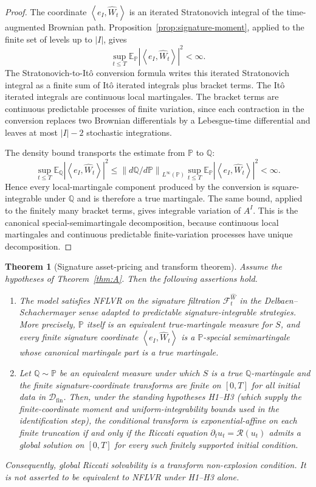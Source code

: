 \documentclass[11pt,oneside]{article}
\theoremstyle{plain}
\newtheorem{theorem}{Theorem}[section]
\theoremstyle{definition}
\theoremstyle{remark}
\newcommand{\E}{\mathbb{E}}
\newcommand{\Q}{\mathbb{Q}}
\newcommand{\Pp}{\mathbb{P}}
\newcommand{\cW}{\widehat W}
\newcommand{\FWh}{\mathcal F^{\widehat W}}
\newcommand{\Rs}{\mathcal R}
\newcommand{\norm}[1]{\left\lVert #1\right\rVert}
\newcommand{\abs}[1]{\left\lvert #1\right\rvert}
\newcommand{\inner}[2]{\left\langle #1,#2\right\rangle}
\begin{document}
\begin{proof}
The coordinate $\inner{e_I}{\cW_t}$ is an iterated Stratonovich integral of the time-augmented Brownian path. Proposition~\ref{prop:signature-moment}, applied to the finite set of levels up to $|I|$, gives
\[
\sup_{t\leq T}\E_\Pp\abs{\inner{e_I}{\cW_t}}^2<\infty.
\]
The Stratonovich-to-It\^o conversion formula writes this iterated Stratonovich integral as a finite sum of It\^o iterated integrals plus bracket terms. The It\^o iterated integrals are continuous local martingales. The bracket terms are continuous predictable processes of finite variation, since each contraction in the conversion replaces two Brownian differentials by a Lebesgue-time differential and leaves at most $|I|-2$ stochastic integrations.

The density bound transports the estimate from $\Pp$ to $\Q$:
\[
\sup_{t\leq T}\E_\Q\abs{\inner{e_I}{\cW_t}}^2
\leq \norm{d\Q/d\Pp}_{L^\infty(\Pp)}
\sup_{t\leq T}\E_\Pp\abs{\inner{e_I}{\cW_t}}^2<\infty.
\]
Hence every local-martingale component produced by the conversion is square-integrable under $\Q$ and is therefore a true martingale. The same bound, applied to the finitely many bracket terms, gives integrable variation of $A^I$. This is the canonical special-semimartingale decomposition, because continuous local martingales and continuous predictable finite-variation processes have unique decomposition.
\end{proof}

\begin{theorem}[Signature asset-pricing and transform theorem]\label{thm:B}
Assume the hypotheses of Theorem~\ref{thm:A}. Then the following assertions hold.
\begin{enumerate}[label=(\roman*)]
\item The model satisfies NFLVR on the signature filtration $\FWh_t$ in the Delbaen--Schachermayer sense adapted to predictable signature-integrable strategies. More precisely, $\Pp$ itself is an equivalent true-martingale measure for $S$, and every finite signature coordinate $\inner{e_I}{\cW_t}$ is a $\Pp$-special semimartingale whose canonical martingale part is a true martingale.
\item Let $\Q\sim\Pp$ be an equivalent measure under which $S$ is a true $\Q$-martingale and the finite signature-coordinate transforms are finite on $[0,T]$ for all initial data in $\mathcal D_{\mathrm{fin}}$. Then, under the standing hypotheses H1--H3 (which supply the finite-coordinate moment and uniform-integrability bounds used in the identification step), the conditional transform is exponential-affine on each finite truncation if and only if the Riccati equation $\partial_tu_t=\Rs(u_t)$ admits a global solution on $[0,T]$ for every such finitely supported initial condition.
\end{enumerate}
Consequently, global Riccati solvability is a transform non-explosion condition. It is not asserted to be equivalent to NFLVR under H1--H3 alone.
\end{theorem}
\end{document}
